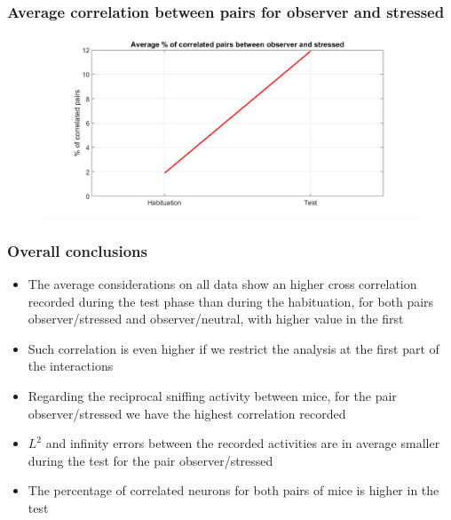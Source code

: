 \documentclass{beamer}
\begin{document}
\begin{frame}
\frametitle{ Average correlation between pairs for observer and stressed}



\begin{figure}[H]
	\begin{center}
		\hspace*{-1.7cm}
		\includegraphics[scale=.32]{perc_stress.jpg} 
	\end{center}  
	
	
\end{figure}

\end{frame}


\begin{frame}
\frametitle{ Overall conclusions}



\begin{itemize}
	
	\item The average considerations on all data show an higher cross correlation recorded during the test phase than during the habituation, for both pairs observer/stressed and observer/neutral, with higher value in the first
	
	\item Such correlation is even higher if we restrict the analysis at the first part of the interactions
	
	\item Regarding the reciprocal  sniffing activity between mice, for the pair observer/stressed we have the highest correlation recorded
	
	\item $L^2$ and infinity errors between the recorded activities are in average smaller  during the test for the pair observer/stressed
	
	\item The percentage of correlated neurons for both pairs of mice is higher in the test

	
\end{itemize}

\end{frame}
\end{document}
